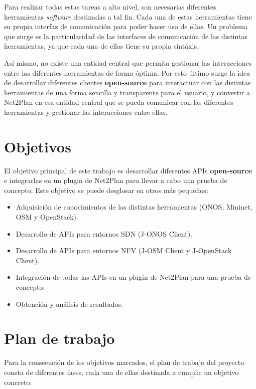 Para realizar todas estas tareas a alto nivel, son necesarias diferentes herramientas \textit{software} destinadas a tal fin. Cada una de estas herramientas tiene su propia interfaz de comunicación para poder hacer uso de ellas. Un problema que surge es la particularidad de las interfaces de comunicación de las distintas herramientas, ya que cada una de ellas tiene su propia sintáxis.

Así mismo, no existe una entidad central que permita gestionar las interacciones entre las diferentes herramientas de forma óptima. Por esto último surge la idea de desarrollar diferentes clientes \textbf{open-source} para interactuar con las distintas herramientas de una forma sencilla y transparente para el usuario, y convertir a Net2Plan en esa entidad central que se pueda comunicar con las diferentes herramientas y gestionar las interacciones entre ellas.

\section{Objetivos}

El objetivo principal de este trabajo es desarrollar diferentes APIs \textbf{open-source} e integrarlas en un plugin de Net2Plan para llevar a cabo una prueba de concepto. Este objetivo se puede desglosar en otros más pequeños:

\begin{itemize}
	\item Adquisición de conocimientos de las distintas herramientas (ONOS, Mininet, OSM y OpenStack). 
	\item Desarrollo de APIs para entornos SDN (J-ONOS Client).
	\item Desarrollo de APIs para entornos NFV (J-OSM Client y J-OpenStack Client).
	\item Integración de todas las APIs en un plugin de Net2Plan para una prueba de concepto.
	\item Obtención y análisis de resultados.
\end{itemize}

\section{Plan de trabajo}

Para la consecución de los objetivos marcados, el plan de trabajo del proyecto consta de diferentes fases, cada una de ellas destinada a cumplir un objetivo concreto:

